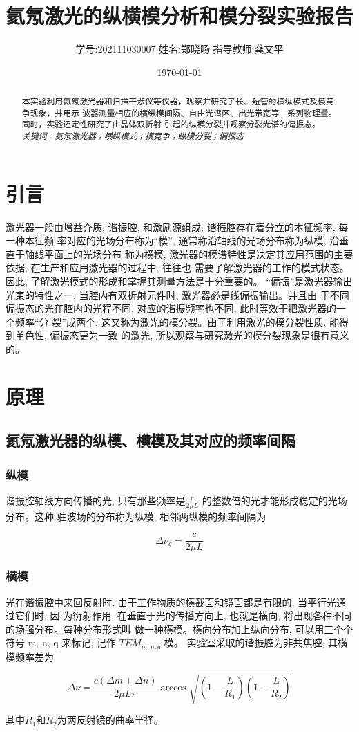 \documentclass[12pt,a4paper]{article}
\title{\vspace{-4cm}\Large 氦氖激光的纵横模分析和模分裂实验报告}  %
\author{\kaishu 学号:202111030007 \hspace{2cm} 姓名:郑晓旸 \hspace{2cm} 指导教师:龚文平}   %
\date{\today}
\newcommand{\be}[1]{
    \begin{equation}
        #1
    \end{equation}
}
\begin{document}
\maketitle

\begin{abstract}
    本实验利用氦氖激光器和扫描干涉仪等仪器，观察并研究了长、短管的横纵模式及模竞争现象，并用示
波器测量相应的横纵模间隔、自由光谱区、出光带宽等一系列物理量。同时，实验还定性研究了由晶体双折射
引起的纵模分裂并观察分裂光谱的偏振态。\\
    \textsl{关键词：氦氖激光器；横纵模式；模竞争；纵模分裂；偏振态}
\end{abstract}

\section{引言}
激光器一般由增益介质, 谐振腔, 和激励源组成, 谐振腔存在着分立的本征频率, 每一种本征频
率对应的光场分布称为“模”, 通常称沿轴线的光场分布称为纵模, 沿垂直于轴线平面上的光场分布
称为横模, 激光器的模谱特性是决定其应用范围的主要依据, 在生产和应用激光器的过程中, 往往也
需要了解激光器的工作的模式状态。因此, 了解激光模式的形成和掌握其测量方法是十分重要的。
“偏振”是激光器输出光束的特性之一, 当腔内有双折射元件时, 激光器必是线偏振输出。并且由
于不同偏振态的光在腔内的光程不同, 对应的谐振频率也不同, 此时等效于把激光器的一个频率“分
裂”成两个, 这又称为激光的模分裂。由于利用激光的模分裂性质, 能得到单色性, 偏振态更为一致
的激光, 所以观察与研究激光的模分裂现象是很有意义的。 \cite{textbook}

\section{原理}
\subsection{氦氖激光器的纵模、横模及其对应的频率间隔}
\subsubsection{纵模}
谐振腔轴线方向传播的光, 只有那些频率是$\frac{c}{2\mu L}$
的整数倍的光才能形成稳定的光场分布。这种
驻波场的分布称为纵模, 相邻两纵模的频率间隔为
\be{\Delta \nu_q=\frac{c}{2\mu L}}
\subsubsection{横模}
光在谐振腔中来回反射时, 由于工作物质的横截面和镜面都是有限的, 当平行光通过它们时, 因
为衍射作用, 在垂直于光的传播方向上, 也就是横向, 将出现各种不同的场强分布。每种分布形式叫
做一种横模。横向分布加上纵向分布, 可以用三个个符号 m, n, q 来标记, 记作 $TEM_{m,n,q}$ 模。
实验室采取的谐振腔为非共焦腔, 其横模频率差为
\be{\Delta \nu=\frac{c(\Delta m+\Delta n)}{2\mu L \pi}\arccos{\sqrt{(1-\frac{L}{R_1})(1-\frac{L}{R_2})}}}
其中$R_1$和$R_2$为两反射镜的曲率半径。
\end{document}
